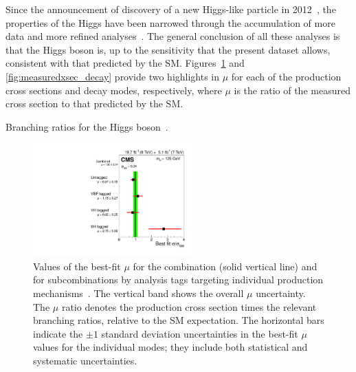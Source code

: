 Since the announcement of discovery of a new Higgs-like particle
in 2012~\cite{higgsdiscoveryAtlas,Chatrchyan:2012ufa}, the properties of the Higgs have been narrowed
through the accumulation of more data and more refined analyses~\cite{Hdiscovery}. The general
conclusion of all these analyses is that the Higgs boson is, up to the sensitivity that the present
dataset allows, consistent with that predicted by the SM. Figures~\ref{fig:measuredxsec_prod} and
\ref{fig:measuredxsec_decay} provide two highlights in $\mu$ for each of the
production cross sections and decay modes, respectively, where $\mu$ is the
ratio of the measured cross section to that predicted by the SM.

\begin{table}[ht]
  \centering
  \renewcommand{\arraystretch}{1.4}
  \caption{Branching ratios for the Higgs boson~\cite{LHC:SMHiggsBR}.}
  
  \label{table:BR_SMhiggs}
\end{table}

\begin{figure}[ht]
 \begin{center}
    \includegraphics[width=0.55\textwidth]{figures/intro/sqr_mlz_ccc_mH125_prod.pdf}
      \end{center}
\caption{Values of the best-fit $\mu$ for the combination (solid vertical line) and for
subcombinations by analysis tags targeting individual production mechanisms~\cite{Khachatryan:1979247}.
The vertical band shows the overall $\mu$ uncertainty. The $\mu$ ratio denotes the production cross section times the relevant branching ratios, relative to the SM expectation. The horizontal bars indicate the $\pm 1$ standard deviation uncertainties in the best-fit $\mu$ values for the individual modes; they include both statistical and systematic uncertainties.}
\label{fig:measuredxsec_prod}
\end{figure}

